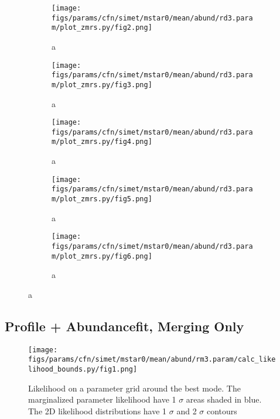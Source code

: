 \documentclass[twocolumn]{article}
\begin{document}
\begin{figure}
  \begin{subfigure}{.5\textwidth}
    \centering\texttt{[image: figs/params/cfn/simet/mstar0/mean/abund/rd3.param/plot\_zmrs.py/fig2.png]}
    \caption{a}
  \end{subfigure}
  \begin{subfigure}{.5\textwidth}
    \centering\texttt{[image: figs/params/cfn/simet/mstar0/mean/abund/rd3.param/plot\_zmrs.py/fig3.png]}
    \caption{a}
  \end{subfigure}
  \begin{subfigure}{.5\textwidth}
    \centering\texttt{[image: figs/params/cfn/simet/mstar0/mean/abund/rd3.param/plot\_zmrs.py/fig4.png]}
    \caption{a}
  \end{subfigure}%
  \begin{subfigure}{.5\textwidth}
    \centering\texttt{[image: figs/params/cfn/simet/mstar0/mean/abund/rd3.param/plot\_zmrs.py/fig5.png]}
    \caption{a}
  \end{subfigure}
  \begin{subfigure}{.5\textwidth}
    \centering\texttt{[image: figs/params/cfn/simet/mstar0/mean/abund/rd3.param/plot\_zmrs.py/fig6.png]}
    \caption{a}
  \end{subfigure}
\end{figure}
\clearpage


\subsection{Profile + Abundancefit, Merging Only}
\begin{figure}[H]
  \center\texttt{[image: figs/params/cfn/simet/mstar0/mean/abund/rm3.param/calc\_likelihood\_bounds.py/fig1.png]}
  \caption{Likelihood on a parameter grid around the best mode. The marginalized parameter likelihood have
    1 $\sigma$ areas shaded in blue. The 2D likelihood distributions have 1 $\sigma$  and 2 $\sigma$ contours}
  \label{fig:basic_rd:likelihood}
\end{figure}
\end{document}

